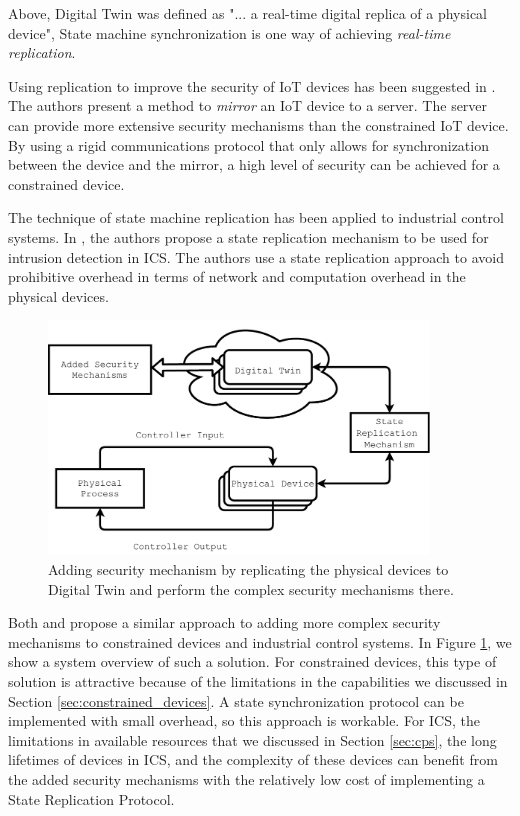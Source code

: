 Above, Digital Twin was defined as "... a real-time digital replica of a physical device", State machine synchronization is one way of achieving \emph{real-time replication}.

Using replication to improve the security of IoT devices has been suggested in \cite{gehrmann2016iot}. The authors present a method to \emph{mirror} an IoT device to a server. The server can provide more extensive security mechanisms than the constrained IoT device. By using a rigid communications protocol that only allows for synchronization between the device and the mirror, a high level of security can be achieved for a constrained device.

The technique of state machine replication has been applied to industrial control systems. In \cite{Eckhart2018}, the authors propose a state replication mechanism to be used for intrusion detection in ICS. The authors use a state replication approach to avoid prohibitive overhead in terms of network and computation overhead in the physical devices.

\begin{figure}[ht]
\centering
\includegraphics[width=0.9\textwidth]{images/state_replication_security.pdf}
\caption{Adding security mechanism by replicating the physical devices to Digital Twin and perform the complex security mechanisms there.}
\label{fig:state-replication-sec}
\end{figure}

Both \cite{gehrmann2016iot} and \cite{Eckhart2018} propose a similar approach to adding more complex security mechanisms to constrained devices and industrial control systems. In Figure \ref{fig:state-replication-sec}, we show a system overview of such a solution. For constrained devices, this type of solution is attractive because of the limitations in the capabilities we discussed in Section \ref{sec:constrained_devices}. A state synchronization protocol can be implemented with small overhead, so this approach is workable. For ICS, the limitations in available resources that we discussed in Section \ref{sec:cps}, the long lifetimes of devices in ICS, and the complexity of these devices can benefit from the added security mechanisms with the relatively low cost of implementing a State Replication Protocol.

